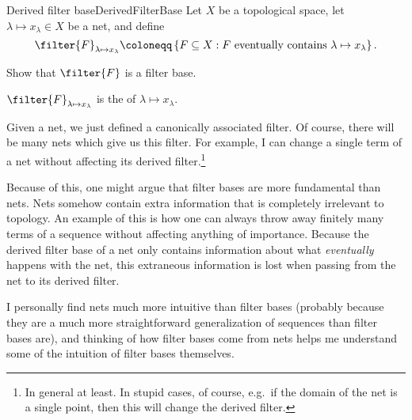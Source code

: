 \begin{dfn}{Derived filter base}{DerivedFilterBase}
Let $X$ be a topological space, let $\lambda \mapsto x_\lambda \in X$ be a net, and define
\begin{equation*}
\filter{F}_{\lambda \mapsto x_\lambda}\coloneqq \left\{ F\subseteq X:F\text{ eventually contains }\lambda \mapsto x_\lambda \right\} .
\end{equation*}
\begin{exr}[breakable=false]{}{}
Show that $\filter{F}$ is a filter base.
\end{exr}
$\filter{F}_{\lambda \mapsto x_\lambda}$ is the  of $\lambda \mapsto x_\lambda$.
\begin{rmk}
Given a net, we just defined a canonically associated filter.  Of course, there will be many nets which give us this filter.  For example, I can change a single term of a net without affecting its derived filter.\footnote{In general at least.  In stupid cases, of course, e.g.~if the domain of the net is a single point, then this will change the derived filter.}
\end{rmk}
\begin{rmk}
Because of this, one might argue that filter bases are more fundamental than nets.  Nets somehow contain extra information that is completely irrelevant to topology.  An example of this is how one can always throw away finitely many terms of a sequence without affecting anything of importance.  Because the derived filter base of a net only contains information about what \emph{eventually} happens with the net, this extraneous information is lost when passing from the net to its derived filter.
\end{rmk}
\begin{rmk}
I personally find nets much more intuitive than filter bases (probably because they are a much more straightforward generalization of sequences than filter bases are), and thinking of how filter bases come from nets helps me understand some of the intuition of filter bases themselves.
\end{rmk}
\end{dfn}

